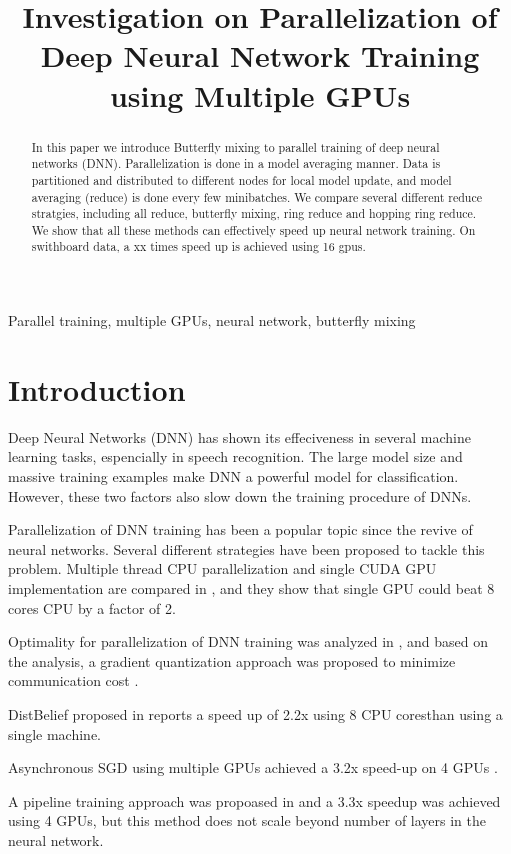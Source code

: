 \documentclass{article}
\title{Investigation on Parallelization of Deep Neural Network Training using Multiple GPUs}
\begin{document}
%
\maketitle
%
\begin{abstract}
In this paper we introduce Butterfly mixing to parallel training of deep neural networks (DNN). Parallelization is done
in a model averaging manner. Data is partitioned and distributed to different nodes for local model update, and
model averaging (reduce) is done every few minibatches. We compare several different reduce stratgies, including
all reduce, butterfly mixing, ring reduce and hopping ring reduce. We show that all these methods can effectively
speed up neural network training. On swithboard data, a xx times speed up is achieved using 16 gpus.

\end{abstract}
%
\begin{keywords}
Parallel training, multiple GPUs, neural network, butterfly mixing
\end{keywords}
%
\section{Introduction}
\label{sec:intro}
Deep Neural Networks (DNN) has shown its effeciveness in several machine learning tasks, espencially in speech
recognition. The large model size and massive training examples make DNN a powerful model for classification. However,
these two factors also slow down the training procedure of DNNs.

Parallelization of DNN training has been a popular topic since the revive of neural networks. Several different strategies
have been proposed to tackle this problem. Multiple thread CPU parallelization and single CUDA GPU implementation are compared
in \cite{scanzio2010parallel,vesely2010parallel}, and they show that single GPU could beat 8 cores CPU by a factor of 2.

Optimality for parallelization of DNN training was analyzed in \cite{seide2014parallelizability}, and based on the analysis, 
a gradient quantization approach was proposed to minimize communication cost \cite{seide20141}.

DistBelief proposed in \cite{dean2012large} reports a speed up of 2.2x using 8 CPU coresthan using a
single machine.


Asynchronous SGD using multiple GPUs achieved a 3.2x speed-up on 4 GPUs \cite{zhang2013asynchronous}.

A pipeline training approach was propoased in \cite{chen2012pipelined} and a 3.3x speedup was achieved using 4 GPUs, but this
method does not scale beyond number of layers in the neural network.
\end{document}
